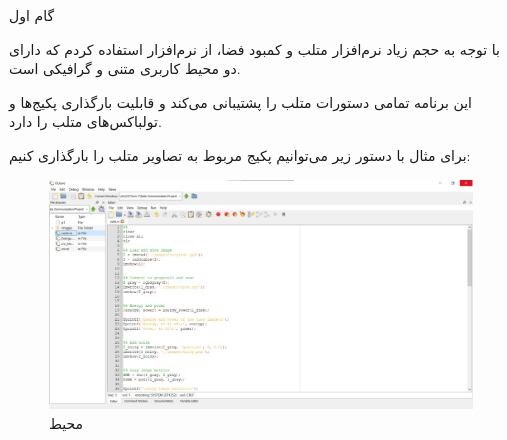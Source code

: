 \Problem
{گام اول}
{
    با توجه به حجم زیاد نرم‌افزار متلب و کمبود فضا، از نرم‌افزار 
    استفاده کردم که دارای دو محیط کاربری متنی و گرافیکی است.
    
    این برنامه تمامی دستورات متلب را پشتیبانی می‌کند و قابلیت بارگذاری پکیج‌ها و تولباکس‌های متلب را دارد. 
    
    برای مثال با دستور زیر می‌توانیم پکیج مربوط به تصاویر متلب را بارگذاری کنیم:
    
    
    \begin{figure}[H]
        \includegraphics[width=15cm]{Images/Octave.jpg}
        \centering
        \caption{محیط }
    \end{figure}
}
